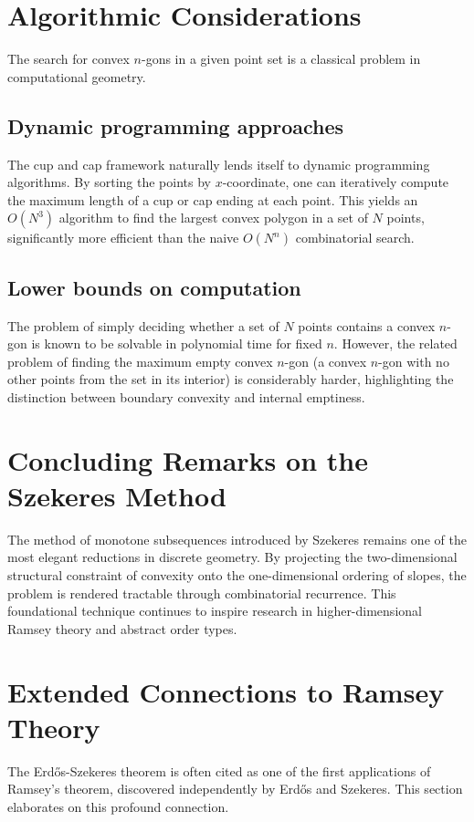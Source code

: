 \documentclass[11pt,a4paper]{article}
\begin{document}
\section{Algorithmic Considerations}

The search for convex $n$-gons in a given point set is a classical problem in computational geometry.

\subsection{Dynamic programming approaches}
The cup and cap framework naturally lends itself to dynamic programming algorithms. By sorting the points by $x$-coordinate, one can iteratively compute the maximum length of a cup or cap ending at each point. This yields an $O(N^3)$ algorithm to find the largest convex polygon in a set of $N$ points, significantly more efficient than the naive $O(N^n)$ combinatorial search.

\subsection{Lower bounds on computation}
The problem of simply deciding whether a set of $N$ points contains a convex $n$-gon is known to be solvable in polynomial time for fixed $n$. However, the related problem of finding the maximum empty convex $n$-gon (a convex $n$-gon with no other points from the set in its interior) is considerably harder, highlighting the distinction between boundary convexity and internal emptiness.

\section{Concluding Remarks on the Szekeres Method}
The method of monotone subsequences introduced by Szekeres remains one of the most elegant reductions in discrete geometry. By projecting the two-dimensional structural constraint of convexity onto the one-dimensional ordering of slopes, the problem is rendered tractable through combinatorial recurrence. This foundational technique continues to inspire research in higher-dimensional Ramsey theory and abstract order types.

\section{Extended Connections to Ramsey Theory}

The Erd\H{o}s-Szekeres theorem is often cited as one of the first applications of Ramsey's theorem, discovered independently by Erd\H{o}s and Szekeres. This section elaborates on this profound connection.
\end{document}
